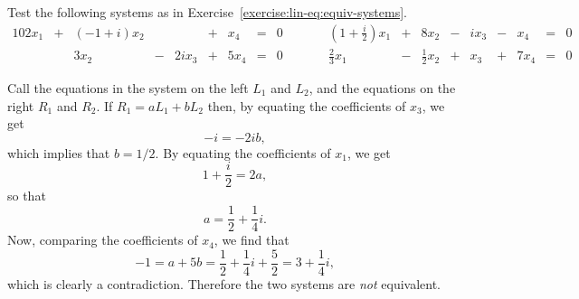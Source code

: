  Test the following systems as in
Exercise~\ref{exercise:lin-eq:equiv-systems}.
\begin{alignat*}{10}
  2x_1 &{}+{}& (-1 + i)x_2 &     &       &{}+{}&  x_4 &{}={}& 0
  &\qquad& \left(1+\frac{i}2\right)x_1 &{}+{}&       8x_2
  &{}-{}& ix_3 &{}-{}&  x_4 &{}={}& 0 \\
       &     &        3x_2 &{}-{}& 2ix_3 &{}+{}& 5x_4 &{}={}& 0
  &      &                  \tfrac23x_1 &{}-{}& \tfrac12x_2
  &{}+{}&  x_3 &{}+{}& 7x_4 &{}={}& 0
\end{alignat*}
\begin{solution}
  Call the equations in the system on the left $L_1$ and $L_2$, and
  the equations on the right $R_1$ and $R_2$. If $R_1 = aL_1 + bL_2$
  then, by equating the coefficients of $x_3$, we get
  \begin{equation*}
    -i = -2ib,
  \end{equation*}
  which implies that $b = 1/2$. By equating the coefficients of $x_1$,
  we get
  \begin{equation*}
    1 + \frac{i}2 = 2a,
  \end{equation*}
  so that
  \begin{equation*}
    a = \frac12 + \frac14i.
  \end{equation*}
  Now, comparing the coefficients of $x_4$, we find that
  \begin{equation*}
    -1 = a + 5b = \frac12 + \frac14i + \frac52
    = 3 + \frac14i,
  \end{equation*}
  which is clearly a contradiction. Therefore the two systems are {\em
    not} equivalent.
\end{solution}
